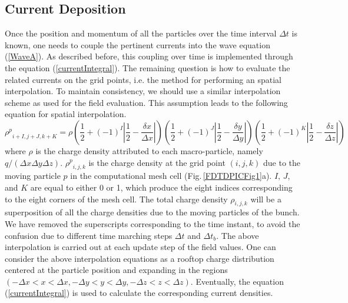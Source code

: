 \subsection{Current Deposition}

Once the position and momentum of all the particles over the time interval $\Delta t $ is known, one needs to couple the pertinent currents into the wave equation (\ref{WaveA}).
%
As described before, this coupling over time is implemented through the equation (\ref{currentIntegral}).
%
The remaining question is how to evaluate the related currents on the grid points, i.e. the method for performing an spatial interpolation.
%
To maintain consistency, we should use a similar interpolation scheme as used for the field evaluation.
%
This assumption leads to the following equation for spatial interpolation.
%
\begin{equation}
{\rho^p}_{i+I,j+J,k+K} = \rho \left(\frac{1}{2} + (-1)^I \left| \frac{1}{2} - \frac{\delta x}{\Delta x} \right| \right)
\left(\frac{1}{2} + (-1)^J \left| \frac{1}{2} - \frac{\delta y}{\Delta y} \right| \right)
\left(\frac{1}{2} + (-1)^K \left| \frac{1}{2} - \frac{\delta z}{\Delta z} \right| \right)
\end{equation}
%
where $\rho$ is the charge density attributed to each macro-particle, namely $q/(\Delta x \Delta y \Delta z)$.
%
${\rho^p}_{i,j,k}$ is the charge density at the grid point $(i,j,k)$ due to the moving particle $p$ in the computational mesh cell (Fig.\,\ref{FDTDPICFig1}a).
%
$I$, $J$, and $K$ are equal to either 0 or 1, which produce the eight indices corresponding to the eight corners of the mesh cell.
%
The total charge density $\rho_{i,j,k}$ will be a superposition of all the charge densities due to the moving particles of the bunch.
%
We have removed the superscripts corresponding to the time instant, to avoid the confusion due to different time marching steps $\Delta t$ and $\Delta t_b$.
%
The above interpolation is carried out at each update step of the field values.
%
One can consider the above interpolation equations as a rooftop charge distribution centered at the particle position and expanding in the regions $(-\Delta x < x < \Delta x, -\Delta y < y < \Delta y, -\Delta z < z < \Delta z)$.
%
Eventually, the equation (\ref{currentIntegral}) is used to calculate the corresponding current densities.

